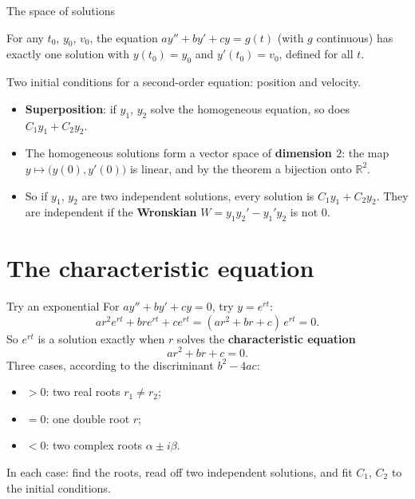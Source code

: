 \documentclass[10pt]{wosm-slides}
\newcommand{\R}{\mathbb{R}}
\begin{document}
\begin{frame}{The space of solutions}
  \begin{theorem}
    For any $t_0$, $y_0$, $v_0$, the equation $a y'' + b y' + c y = g(t)$ (with $g$ continuous) has exactly
    one solution with $y(t_0) = y_0$ and $y'(t_0) = v_0$, defined for all $t$.
  \end{theorem}
  {\small Two initial conditions for a second-order equation: position and velocity.\par}
  \pause
  \begin{itemize}
    \item \textbf{Superposition}: if $y_1$, $y_2$ solve the homogeneous equation, so does $C_1 y_1 + C_2 y_2$.
    \pause
    \item The homogeneous solutions form a vector space of \textbf{dimension $2$}: the map
      $y \mapsto \bigl(y(0), y'(0)\bigr)$ is linear, and by the theorem a bijection onto $\R^2$.
    \item So if $y_1$, $y_2$ are two independent solutions, every solution is $C_1 y_1 + C_2 y_2$.
      They are independent if the \textbf{Wronskian} $W = y_1 y_2' - y_1' y_2$ is not $0$.
  \end{itemize}
\end{frame}

\section{The characteristic equation}

\begin{frame}{Try an exponential}
  For $a y'' + b y' + c y = 0$, try $y = e^{rt}$:
  \[ a r^2 e^{rt} + b r e^{rt} + c e^{rt} = (a r^2 + b r + c)\, e^{rt} = 0 . \]
  \pause
  So $e^{rt}$ is a solution exactly when $r$ solves the \textbf{characteristic equation}
  \[ a r^2 + b r + c = 0 . \]
  \pause
  Three cases, according to the discriminant $b^2 - 4ac$:
  \begin{itemize}
    \item $> 0$: two real roots $r_1 \ne r_2$;
    \item $= 0$: one double root $r$;
    \item $< 0$: two complex roots $\alpha \pm i\beta$.
  \end{itemize}
  {\small In each case: find the roots, read off two independent solutions, and fit $C_1$, $C_2$ to the
  initial conditions.\par}
\end{frame}
\end{document}
